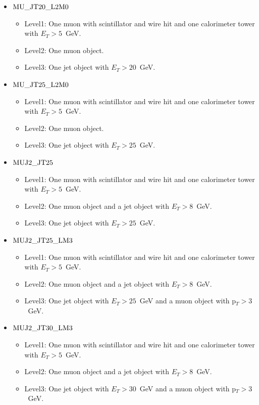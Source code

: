 \begin{itemize}
\item $\rm{MU\_JT20\_L2M0}$
\begin{itemize}
\item Level1: One muon with scintillator and wire hit and one calorimeter tower with $E_{T}>5$~GeV.
\item Level2: One muon object.
\item Level3: One jet object with $E_{T}>20$~GeV.
\end{itemize}
\item $\rm{MU\_JT25\_L2M0}$
\begin{itemize}
\item Level1: One muon with scintillator and wire hit and one calorimeter tower with $E_{T}>5$~GeV.
\item Level2: One muon object.
\item Level3: One jet object with $E_{T}>25$~GeV.
\end{itemize}
\item $\rm{MUJ2\_JT25}$
\begin{itemize}
\item Level1: One muon with scintillator and wire hit and one calorimeter tower with $E_{T}>5$~GeV.
\item Level2: One muon object and a jet object with $E_{T}>8$~GeV.
\item Level3: One jet object with $E_{T}>25$~GeV.
\end{itemize}
\item $\rm{MUJ2\_JT25\_LM3}$
\begin{itemize}
\item Level1: One muon with scintillator and wire hit and one calorimeter tower with $E_{T}>5$~GeV.
\item Level2: One muon object and a jet object with $E_{T}>8$~GeV.
\item Level3: One jet object with $E_{T}>25$~GeV and a muon object with p$_{T}>3$~GeV.
\end{itemize}
\item $\rm{MUJ2\_JT30\_LM3}$
\begin{itemize}
\item Level1: One muon with scintillator and wire hit and one calorimeter tower with $E_{T}>5$~GeV.
\item Level2: One muon object and a jet object with $E_{T}>8$~GeV.
\item Level3: One jet object with $E_{T}>30$~GeV and a muon object with p$_{T}>3$~GeV.
\end{itemize}

\end{itemize}
